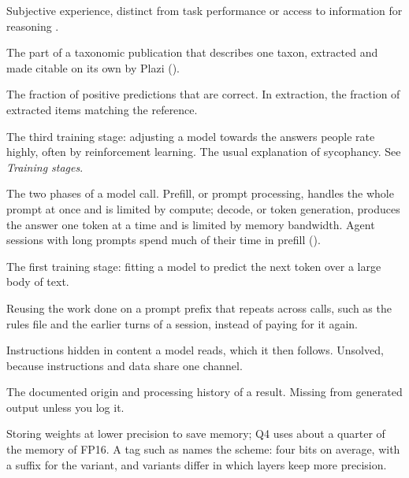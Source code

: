 \begin{description}[itemsep=0.2em]
\item[Phenomenal consciousness] Subjective experience, distinct from task
  performance or access to information for reasoning
  \parencite{chandaria2026consciousness}.

\item[Plazi treatment] The part of a taxonomic publication that describes one
  taxon, extracted and made citable on its own by Plazi
  ().

\item[Precision] The fraction of positive predictions that are correct.
  In extraction, the fraction of extracted items matching the reference.

\item[Preference tuning] The third training stage: adjusting a model towards
  the answers people rate highly, often by reinforcement learning. The usual
  explanation of sycophancy. See \emph{Training stages}.

\item[Prefill and decode] The two phases of a model call. Prefill, or prompt
  processing, handles the whole prompt at once and is limited by compute;
  decode, or token generation, produces the answer one token at a time and
  is limited by memory bandwidth. Agent sessions with long prompts spend
  much of their time in prefill ().

\item[Pretraining] The first training stage: fitting a model to predict the
  next token over a large body of text.

\item[Prompt caching] Reusing the work done on a prompt prefix that repeats
  across calls, such as the rules file and the earlier turns of a session,
  instead of paying for it again.

\item[Prompt injection] Instructions hidden in content a model reads, which it
  then follows. Unsolved, because instructions and data share one channel.

\item[Provenance] The documented origin and processing history of a result.
  Missing from generated output unless you log it.

\item[Quantisation] Storing weights at lower precision to save memory; Q4 uses
  about a quarter of the memory of FP16. A tag such as  names
  the scheme: four bits on average, with a suffix for the variant, and
  variants differ in which layers keep more precision.


\end{description}
